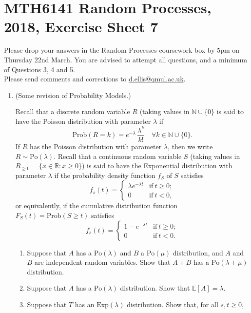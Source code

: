 \documentclass[11pt,a4paper]{article}
\begin{document}
    \section*{MTH6141 Random Processes, 2018, Exercise Sheet 7}
    Please drop your answers in the Random Processes coursework box by 5pm on Thursday 22nd March. You are advised to attempt all questions, and a minimum of Questions 3, 4 and 5.\\
    Please send comments and corrections to \href{d.ellis@qmul.ac.uk}{d.ellis@qmul.ac.uk}.
    \begin{enumerate}
        \item (Some revision of Probability Models.)\par
        Recall that a discrete random variable $R$ (taking values in $\mathbb{N} \cup \{0\}$ is said to have the Poisson distribution with parameter $\lambda$ if
        $$\text{Prob}(R = k) = e^{-\lambda}\, \frac{\lambda^k}{k!} \quad \forall k \in \mathbb{N}\cup \{0\}.$$
        If $R$ has the Poisson distribution with parameter $\lambda$, then we write $R \sim \text{Po}(\lambda)$. Recall that a continuous random variable $S$ (taking values in $R_{\geq 0} = \{x \in \mathbb{R} : x \geq 0\}$) is said to have the Exponential distribution with parameter $\lambda$ if the probability density function $f_S$ of $S$ satisfies
        $$
        f_s(t)
        =
        \begin{cases}
            \lambda e^{-\lambda t} & \text{if}\ t\geq 0;\\
            0 & \text{if}\ t<0,
        \end{cases}
        $$
        or equivalently, if the cumulative distribution function $F_S(t) = \text{Prob}(S \geq t)$ satisfies
        $$
        f_s(t)
        =
        \begin{cases}
            1 - e^{-\lambda t} & \text{if}\ t \geq 0;\\
            0 & \text{if}\ t<0.
        \end{cases}
        $$
        \begin{enumerate}
            \item Suppose that $A$ has a $\text{Po}(\lambda)$ and $B$ a $\text{Po}(\mu)$ distribution, and $A$ and $B$ are independent random variables. Show that $A + B$ has a $\text{Po}(\lambda + \mu)$ distribution.
            \item Suppose that $A$ has a $\text{Po}(\lambda)$ distribution. Show that $\mathbb{E}[A] = \lambda$.
            \item Suppose that $T$ has an $\text{Exp}(\lambda)$ distribution. Show that, for all $s, t \geq 0$,

\end{enumerate}
\end{enumerate}
\end{document}
